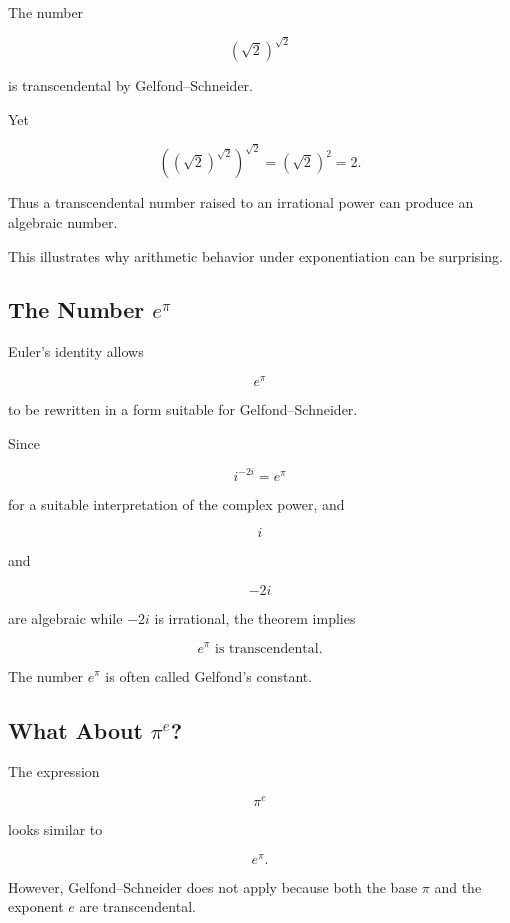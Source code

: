 The number

\[ \left(\sqrt2\right)^{\sqrt2} \]

is transcendental by Gelfond--Schneider.

Yet

\[
\left(
\left(\sqrt2\right)^{\sqrt2}
\right)^{\sqrt2}
=
\left(\sqrt2\right)^2
=
2.
\]

Thus a transcendental number raised to an irrational power can produce an
algebraic number.

This illustrates why arithmetic behavior under exponentiation can be
surprising.

\subsection{The Number \(e^\pi\)}
\label{subsec:gelfond-constant}

Euler's identity allows

\[ e^\pi \]

to be rewritten in a form suitable for Gelfond--Schneider.

Since

\[ i^{-2i}=e^\pi \]

for a suitable interpretation of the complex power, and

\[ i \]

and

\[ -2i \]

are algebraic while \(-2i\) is irrational, the theorem implies

\[ \boxed{e^\pi\text{ is transcendental}.} \]

The number \(e^\pi\) is often called Gelfond's constant.

\subsection{What About \(\pi^e\)?}
\label{subsec:pi-to-e-status}

The expression

\[ \pi^e \]

looks similar to

\[ e^\pi. \]

However, Gelfond--Schneider does not apply because both the base \(\pi\) and
the exponent \(e\) are transcendental.

